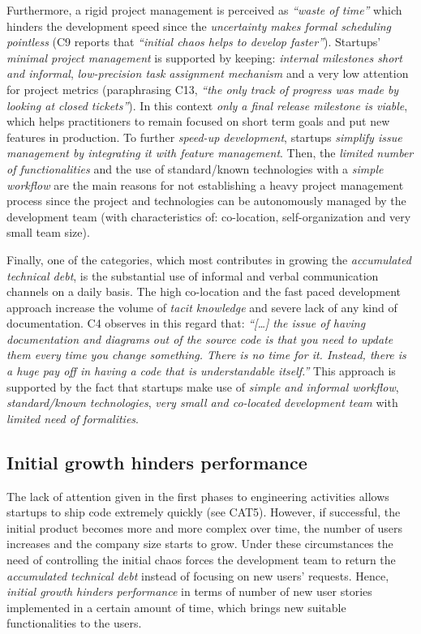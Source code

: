 \documentclass[10pt,journal,letterpaper,compsoc]{IEEEtran}
\begin{document}
Furthermore, a rigid project management is perceived as \textit{``waste of 
time''} which hinders the development speed since the \textit{uncertainty makes 
formal scheduling pointless} (C9  reports that \textit{``initial chaos helps to 
develop faster''}). Startups' \textit{minimal project management}  is supported 
by keeping: \textit{internal milestones short and informal}, 
\textit{low-precision task assignment mechanism}  and a very low attention for 
project metrics (paraphrasing C13, \textit{``the only track of progress was made 
by looking at closed tickets''}). In this context \textit{only a final release 
milestone is viable}, which helps practitioners to remain focused on short term 
goals and put new features in production. To further \textit{speed-up 
development}, startups \textit{simplify issue management by integrating it with 
feature management}. Then, the \textit{limited number of functionalities} and 
the {use of standard/known technologies} with a \textit{simple workflow} are the 
main reasons for 
not establishing a heavy project management process since the project and 
technologies can be autonomously managed by the development team (with 
characteristics of: co-location, self-organization and very small team size). 

Finally, one of the categories, which most contributes in growing the 
\textit{accumulated technical debt}, is the substantial  use of informal and 
verbal communication channels on a daily basis. The high co-location and the 
fast paced development approach increase the volume of \textit{tacit knowledge} 
and severe lack of any kind of documentation.  C4 observes in this regard that:  
\textit{``[\ldots] the issue of having documentation and diagrams out of the 
source code is that you need to update them every time you change something. 
There is no time for it. Instead, there is a huge pay off in having a code that 
is understandable itself.''}
This approach is supported by the fact that startups make use of  
\textit{simple and informal workflow}, \textit{standard/known technologies}, 
\textit{very small and co-located development team} with \textit{limited need of 
formalities}.
\subsection{Initial growth hinders performance}
\label{res:gsm:cat6}
The lack of attention given in the first phases to engineering activities 
allows startups to ship code extremely quickly (see CAT5). However, if 
successful, the initial product becomes more and more complex over time, the 
number of users increases and the company size starts to grow. Under these 
circumstances the need of controlling the initial chaos forces the development 
team to return the \textit{accumulated technical debt} instead of focusing on 
new users' requests. Hence, \textit{initial growth hinders performance} in terms 
of number of new user stories implemented in a certain amount of time, which 
brings new suitable functionalities to the users.
\end{document}
